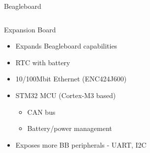 \documentclass{beamer}
\begin{document}
\begin{frame}{Beagleboard}
\begin{columns}[c]
\end{columns}
\end{frame}

\begin{frame}{Expansion Board}
\begin{itemize}
\item Expands Beagleboard capabilities 
\item RTC with battery
\item 10/100Mbit Ethernet (ENC424J600)
\item STM32 MCU (Cortex-M3 based) \begin{itemize}
\item CAN bus
\item Battery/power management
\end{itemize}
\item Exposes more BB peripherals - UART, I2C
\end{itemize}
\end{frame}
\end{document}
